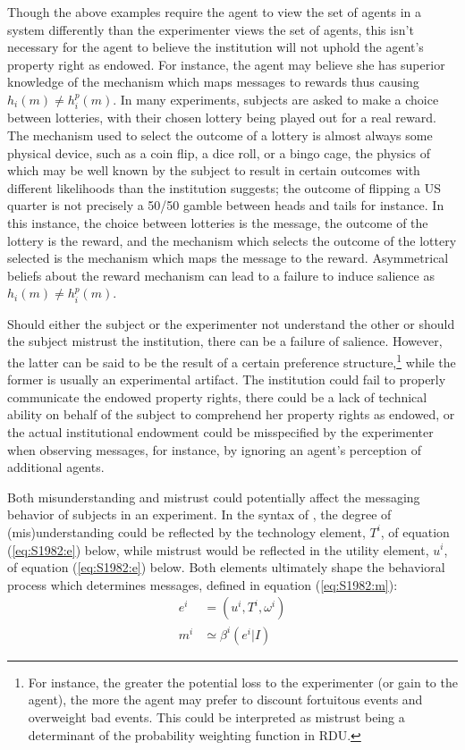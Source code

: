 \documentclass[../main.tex]{subfiles}
\begin{document}
Though the above examples require the agent to view the set of agents in a system differently than the experimenter views the set of agents, this isn't necessary for the agent to believe the institution will not uphold the agent's property right as endowed.
For instance, the agent may believe she has superior knowledge of the mechanism which maps messages to rewards thus causing $h_i(m) \neq h_i^p(m)$.
In many experiments, subjects are asked to make a choice between lotteries, with their chosen lottery being played out for a real reward.
The mechanism used to select the outcome of a lottery is almost always some physical device, such as a coin flip, a dice roll, or a bingo cage, the physics of which may be well known by the subject to result in certain outcomes with different likelihoods than the institution suggests; the outcome of flipping a US quarter is not precisely a 50/50 gamble between heads and tails for instance.
In this instance, the choice between lotteries is the message, the outcome of the lottery is the reward, and the mechanism which selects the outcome of the lottery selected is the mechanism which maps the message to the reward.
Asymmetrical beliefs about the reward mechanism can lead to a failure to induce salience as $h_i(m) \neq h_i^p(m)$.

Should either the subject or the experimenter not understand the other or should the subject mistrust  the institution, there can be a failure of salience.
However, the latter can be said to be the result of a certain preference structure,\footnote{For instance, the greater the potential loss to the experimenter (or gain to the agent), the more the agent may prefer to discount fortuitous events and overweight bad events. This could be interpreted as mistrust being a determinant of the probability weighting function in RDU.} while the former is usually an experimental artifact.
The institution could fail to properly communicate the endowed property rights, there could be a lack of technical ability on behalf of the subject to comprehend her property rights as endowed, or the actual institutional endowment could be misspecified by the experimenter when observing messages, for instance, by ignoring an agent's perception of additional agents.

Both misunderstanding and mistrust could potentially affect the  messaging behavior of subjects in an experiment.
In the syntax of \textcite{Smith1982}, the degree of (mis)understanding could be reflected by the technology element, $T^i$, of equation (\ref{eq:S1982:e}) below, while mistrust would be reflected in the utility element, $u^i$, of equation (\ref{eq:S1982:e}) below.
Both elements ultimately shape the behavioral process which determines messages, defined in equation (\ref{eq:S1982:m}):
\begin{align}
	e^i &= (u^i, T^i, \omega^i)\label{eq:S1982:e}\\
	m^i &\simeq \beta^i(e^i|I)\label{eq:S1982:m}
\end{align}
\end{document}
